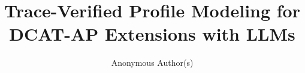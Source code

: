 \documentclass[runningheads]{llncs}
\begin{document}
\title{Trace-Verified Profile Modeling for DCAT-AP Extensions with LLMs}
\author{Anonymous Author(s)}

\maketitle
















\appendix


\end{document}
